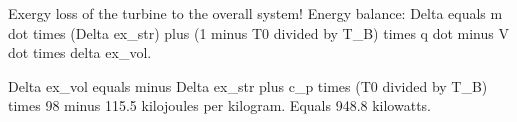 Exergy loss of the turbine to the overall system!  
Energy balance:  
Delta equals m dot times (Delta ex_str) plus (1 minus T0 divided by T_B) times q dot minus V dot times delta ex_vol.  

Delta ex_vol equals minus Delta ex_str plus c_p times (T0 divided by T_B) times 98 minus 115.5 kilojoules per kilogram.  
Equals 948.8 kilowatts.